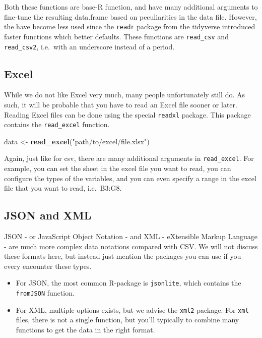 \documentclass[]{tufte-book}
\newenvironment{Shaded}{}{}
\newcommand{\KeywordTok}[1]{\textcolor[rgb]{0.00,0.44,0.13}{\textbf{#1}}}
\newcommand{\NormalTok}[1]{#1}
\newcommand{\StringTok}[1]{\textcolor[rgb]{0.25,0.44,0.63}{#1}}
\providecommand{\tightlist}{%
  \setlength{\itemsep}{0pt}\setlength{\parskip}{0pt}}
\begin{document}
Both these functions are base-R function, and have many additional arguments to fine-tune the resulting data.frame based on peculiarities in the data file. However, the have become less used since the \texttt{readr} package from the tidyverse introduced faster functions which better defaults. These functions are \texttt{read\_csv} and \texttt{read\_csv2}, i.e.~with an underscore instead of a period.

\hypertarget{excel}{%
\subsection{Excel}\label{excel}}

While we do not like Excel very much, many people unfortunately still do. As such, it will be probable that you have to read an Excel file sooner or later. Reading Excel files can be done using the special \texttt{readxl} package. This package contains the \texttt{read\_excel} function.

\begin{Shaded}
\begin{Highlighting}[]
\NormalTok{data <-}\StringTok{ }\KeywordTok{read_excel}\NormalTok{(}\StringTok{"path/to/excel/file.xlsx"}\NormalTok{)}
\end{Highlighting}
\end{Shaded}

Again, just like for csv, there are many additional arguments in \texttt{read\_excel}. For example, you can set the sheet in the excel file you want to read, you can configure the types of the variables, and you can even specify a range in the excel file that you want to read, i.e.~B3:G8.

\hypertarget{json-and-xml}{%
\subsection{JSON and XML}\label{json-and-xml}}

JSON - or JavaScript Object Notation - and XML - eXtensible Markup Language - are much more complex data notations compared with CSV. We will not discuss these formats here, but instead just mention the packages you can use if you every encounter these types.

\begin{itemize}
\tightlist
\item
  For JSON, the most common R-package is \texttt{jsonlite}, which contains the \texttt{fromJSON} function.
\item
  For XML, multiple options exists, but we advise the \texttt{xml2} package. For \texttt{xml} files, there is not a single function, but you'll typically to combine many functions to get the data in the right format.
\end{itemize}
\end{document}
